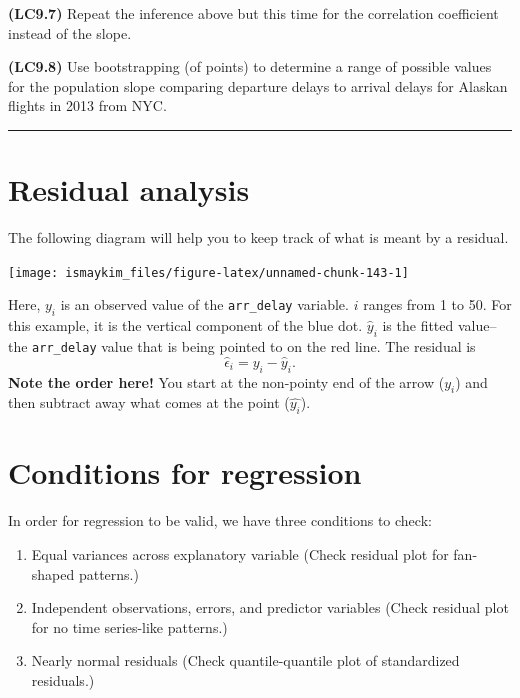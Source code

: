 \documentclass[]{tufte-book}
\let\oldrule=\rule
\renewcommand{\rule}[1]{\oldrule{\linewidth}}
\providecommand{\tightlist}{%
  \setlength{\itemsep}{0pt}\setlength{\parskip}{0pt}}
\theoremstyle{definition}
\theoremstyle{definition}
\theoremstyle{remark}
\begin{document}
\textbf{(LC9.7)} Repeat the inference above but this time for the
correlation coefficient instead of the slope.

\textbf{(LC9.8)} Use bootstrapping (of points) to determine a range of
possible values for the population slope comparing departure delays to
arrival delays for Alaskan flights in 2013 from NYC.

\begin{center}\rule{0.5\linewidth}{\linethickness}\end{center}

\section{Residual analysis}\label{resid}

The following diagram will help you to keep track of what is meant by a
residual.

\begin{center}\texttt{[image: ismaykim\_files/figure-latex/unnamed-chunk-143-1]} \end{center}

Here, \(y_i\) is an observed value of the \texttt{arr\_delay} variable.
\(i\) ranges from 1 to 50. For this example, it is the vertical
component of the blue dot. \(\hat{y}_i\) is the fitted value--the
\texttt{arr\_delay} value that is being pointed to on the red line. The
residual is \[\hat{\epsilon}_i = y_i - \hat{y}_i.\] \textbf{Note the
order here!} You start at the non-pointy end of the arrow (\(y_i\)) and
then subtract away what comes at the point (\(\hat{y_i}\)).

\section{Conditions for regression}\label{conditions-for-regression}

In order for regression to be valid, we have three conditions to check:

\begin{enumerate}
\def\labelenumi{\arabic{enumi}.}
\tightlist
\item
  Equal variances across explanatory variable (Check residual plot for
  fan-shaped patterns.)
\item
  Independent observations, errors, and predictor variables (Check
  residual plot for no time series-like patterns.)
\item
  Nearly normal residuals (Check quantile-quantile plot of standardized
  residuals.)
\end{enumerate}
\end{document}
